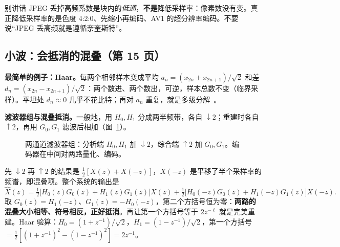 \begin{alertblock}{别讲错}
JPEG 丢掉高频系数是块内的\emph{低通}，\textbf{不是}降低采样率：像素数没有变。真正降低采样率的是色度 4:2:0、先缩小再编码、AV1 的超分辨率编码。不要说“JPEG 丢高频就是遵循奈奎斯特”。
\end{alertblock}

\subsection{小波：会抵消的混叠（第 15 页）}\label{sec:wavelet}
\textbf{最简单的例子：Haar。}每两个相邻样本变成平均 $a_n=(x_{2n}+x_{2n+1})/\sqrt2$ 和差 $d_n=(x_{2n}-x_{2n+1})/\sqrt2$：两个数进、两个数出，可逆，样本总数不变（临界采样）。平坦处 $d_n\approx0$ 几乎不花比特；再对 $a_n$ 重复，就是多级分解~\cite{mallat1989}。

\textbf{滤波器组与混叠抵消。}一般地，用 $H_0,H_1$ 分成两半频带，各自 $\downarrow2$；重建时各自 $\uparrow2$，再用 $G_0,G_1$ 滤波后相加（图~\ref{fig:fb}）。

\begin{figure}[htbp]
\centering
{}
\caption{两通道滤波器组：分析端 $H_0,H_1$ 加 $\downarrow2$，综合端 $\uparrow2$ 加 $G_0,G_1$。编码器在中间对两路量化、编码。}\label{fig:fb}
\end{figure}

先 $\downarrow2$ 再 $\uparrow2$ 的结果是 $\tfrac12[X(z)+X(-z)]$，$X(-z)$ 是平移了半个采样率的频谱，即混叠项。整个系统的输出是
\[
\hat X(z)=\tfrac12\big[H_0(z)G_0(z)+H_1(z)G_1(z)\big]X(z)+\tfrac12\big[H_0(-z)G_0(z)+H_1(-z)G_1(z)\big]X(-z).
\]
取 $G_0(z)=H_1(-z)$、$G_1(z)=-H_0(-z)$，第二个方括号恒为零：\textbf{两路的混叠大小相等、符号相反，正好抵消}。再让第一个方括号等于 $2z^{-\ell}$ 就是完美重建。Haar 验算：$H_0=(1+z^{-1})/\sqrt2$，$H_1=(1-z^{-1})/\sqrt2$，第一个方括号 $=\tfrac12[(1+z^{-1})^2-(1-z^{-1})^2]=2z^{-1}$。

